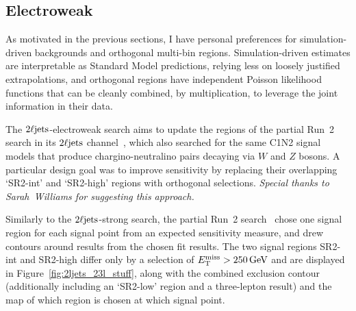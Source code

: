 \subsection{Electroweak}
\label{sec:2ljets_origins_electroweak}
As motivated in the previous sections, I have personal preferences for
simulation-driven backgrounds and orthogonal multi-bin regions.
Simulation-driven estimates are interpretable as Standard Model predictions,
relying less on loosely justified extrapolations,
and orthogonal regions have independent Poisson likelihood functions that can
be cleanly combined, by multiplication, to leverage the joint information in
their data.

The $\twoljets$-electroweak search aims to
update the regions of the partial Run~2 search in its $\twoljets$
channel~\cite{atlas_23l_SUSY_2016_24}, which also searched for the same C1N2
signal models that produce chargino-neutralino pairs decaying via $W$ and $Z$
bosons.
A particular design goal was to improve sensitivity by replacing their overlapping
`SR2-int' and `SR2-high' regions with orthogonal selections.
\emph{Special thanks to Sarah~Williams for suggesting this approach.}

Similarly to the $\twoljets$-strong search, the partial Run~2
search~\cite{atlas_23l_SUSY_2016_24} chose one signal region for each signal
point from an expected sensitivity measure, and drew contours around
results from the chosen fit results.
The two signal regions SR2-int and SR2-high differ only by a selection of
$\met > 250\,\eV[G]$ and are displayed in Figure~\ref{fig:2ljets_23l_stuff},
along with the combined exclusion contour (additionally including an `SR2-low'
region and a three-lepton result) and the map of which region is chosen at
which signal point.

